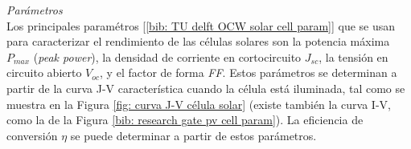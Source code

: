 \documentclass[12pt]{article}
\begin{document}
	\noindent \textit{Parámetros}\\
	
	\noindent Los principales paramétros [\ref{bib: TU delft OCW solar cell param}] que se usan para caracterizar el rendimiento de las células solares son la potencia máxima $P_{max}$ (\textit{peak power}), la densidad de corriente en cortocircuito $J_{sc}$, la tensión en circuito abierto $V_{oc}$, y el factor de forma \textit{FF}. Estos parámetros se determinan a partir de la curva J-V característica cuando la célula está iluminada, tal como se muestra en la Figura \ref{fig: curva J-V célula solar} (existe también la curva I-V, como la de la Figura \ref{bib: research gate pv cell param}). La eficiencia de conversión $\eta$ se puede determinar a partir de estos parámetros. \\
	
\end{document}
